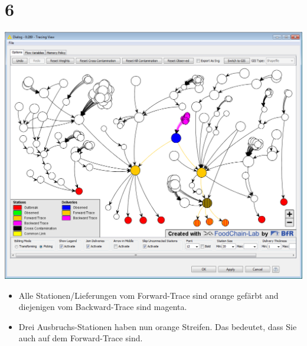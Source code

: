 \documentclass{beamer}
\begin{document}
\section{6}
\begin{frame}
	\begin{center}
  		\includegraphics[height=0.6\textheight]{6.png}
	\end{center}
	\begin{itemize}
		\item Alle Stationen/Lieferungen vom Forward-Trace sind orange gefärbt and diejenigen vom Backward-Trace sind magenta.
		\item Drei Ausbruchs-Stationen haben nun orange Streifen. Das bedeutet, dass Sie auch auf dem Forward-Trace sind.
	\end{itemize}
\end{frame}
\end{document}

